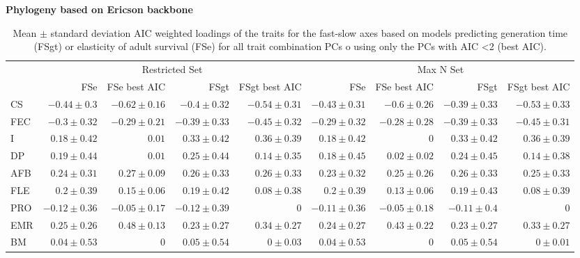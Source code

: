 \begin{landscape}%
\begin{table}
\center
\caption[LHT loadings of the FS axes]{
Mean $\pm$ standard deviation AIC weighted loadings of the traits for the
fast-slow axes based on models predicting generation time (FSgt) or elasticity
of adult survival (FSe) for all trait combination PCs o using only the PCs with
AIC \textless{2} (best AIC).
}
\label{tab:tabApp2.1.2}
\begin{footnotesize}

\textbf{Phylogeny based on Ericson backbone}

\begin{tabular}{@{}l|rrrr|rrrr@{}}
\toprule
  & \multicolumn{4}{c|}{Restricted Set} & \multicolumn{4}{c}{Max N Set}\\
  & FSe & FSe best AIC & FSgt & FSgt best AIC & FSe & FSe best AIC & FSgt & FSgt best AIC\\
\midrule
CS & $-0.44 \pm 0.3$ & $-0.62 \pm 0.16$ & $-0.4 \pm 0.32$ & $-0.54 \pm 0.31$ & $-0.43 \pm 0.31$ & $-0.6 \pm 0.26$ & $-0.39 \pm 0.33$ & $-0.53 \pm 0.33$\\
FEC & $-0.3 \pm 0.32$ & $-0.29 \pm 0.21$ & $-0.39 \pm 0.33$ & $-0.45 \pm 0.32$ & $-0.29 \pm 0.32$ & $-0.28 \pm 0.28$ & $-0.39 \pm 0.33$ & $-0.45 \pm 0.31$\\
I & $0.18 \pm 0.42$ & $0.01$ & $0.33 \pm 0.42$ & $0.36 \pm 0.39$ & $0.18 \pm 0.42$ & $0$ & $0.33 \pm 0.42$ & $0.36 \pm 0.39$\\
DP & $0.19 \pm 0.44$ & $0.01$ & $0.25 \pm 0.44$ & $0.14 \pm 0.35$ & $0.18 \pm 0.45$ & $0.02 \pm 0.02$ & $0.24 \pm 0.45$ & $0.14 \pm 0.38$\\
AFB & $0.24 \pm 0.31$ & $0.27 \pm 0.09$ & $0.26 \pm 0.33$ & $0.26 \pm 0.33$ & $0.23 \pm 0.32$ & $0.25 \pm 0.26$ & $0.26 \pm 0.33$ & $0.25 \pm 0.33$\\
FLE & $0.2 \pm 0.39$ & $0.15 \pm 0.06$ & $0.19 \pm 0.42$ & $0.08 \pm 0.38$ & $0.2 \pm 0.39$ & $0.13 \pm 0.06$ & $0.19 \pm 0.43$ & $0.08 \pm 0.39$\\
PRO & $-0.12 \pm 0.36$ & $-0.05 \pm 0.17$ & $-0.12 \pm 0.39$ & $0$ & $-0.11 \pm 0.36$ & $-0.05 \pm 0.18$ & $-0.11 \pm 0.4$ & $0$\\
EMR & $0.25 \pm 0.26$ & $0.48 \pm 0.13$ & $0.23 \pm 0.27$ & $0.34 \pm 0.27$ & $0.24 \pm 0.27$ & $0.43 \pm 0.22$ & $0.23 \pm 0.27$ & $0.33 \pm 0.27$\\
BM & $0.04 \pm 0.53$ & $0$ & $0.05 \pm 0.54$ & $0 \pm 0.03$ & $0.04 \pm 0.53$ & $0$ & $0.05 \pm 0.54$ & $0 \pm 0.01$\\

\end{tabular}
\end{footnotesize}
\end{table}
\end{landscape}
